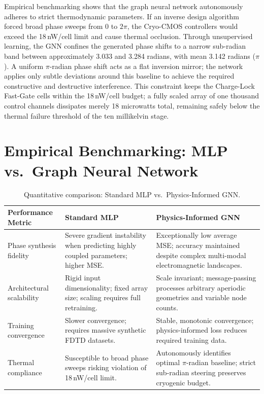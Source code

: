 \documentclass[11pt, a4paper]{article}
\begin{document}
Empirical benchmarking shows that the graph neural network autonomously adheres to strict thermodynamic parameters. If an inverse design algorithm forced broad phase sweeps from 0 to $2\pi$, the Cryo-CMOS controllers would exceed the 18\,nW/cell limit and cause thermal occlusion. Through unsupervised learning, the GNN confines the generated phase shifts to a narrow sub-radian band between approximately 3.033 and 3.284 radians, with mean 3.142 radians ($\pi$). A uniform $\pi$-radian phase shift acts as a flat inversion mirror; the network applies only subtle deviations around this baseline to achieve the required constructive and destructive interference. This constraint keeps the Charge-Lock Fast-Gate cells within the 18\,nW/cell budget; a fully scaled array of one thousand control channels dissipates merely 18 microwatts total, remaining safely below the thermal failure threshold of the ten millikelvin stage.

\section{Empirical Benchmarking: MLP vs.\ Graph Neural Network}

\begin{table}[htbp]
\centering
\caption{Quantitative comparison: Standard MLP vs.\ Physics-Informed GNN.}
\label{tab:benchmark}
\begin{tabular}{@{}p{2.8cm}p{4.2cm}p{4.2cm}@{}}
\toprule
Performance Metric & Standard MLP & Physics-Informed GNN \\
\midrule
Phase synthesis fidelity & Severe gradient instability when predicting highly coupled parameters; higher MSE. & Exceptionally low average MSE; accuracy maintained despite complex multi-modal electromagnetic landscapes. \\
Architectural scalability & Rigid input dimensionality; fixed array size; scaling requires full retraining. & Scale invariant; message-passing processes arbitrary aperiodic geometries and variable node counts. \\
Training convergence & Slower convergence; requires massive synthetic FDTD datasets. & Stable, monotonic convergence; physics-informed loss reduces required training data. \\
Thermal compliance & Susceptible to broad phase sweeps risking violation of 18\,nW/cell limit. & Autonomously identifies optimal $\pi$-radian baseline; strict sub-radian steering preserves cryogenic budget. \\
\bottomrule
\end{tabular}
\end{table}
\end{document}
